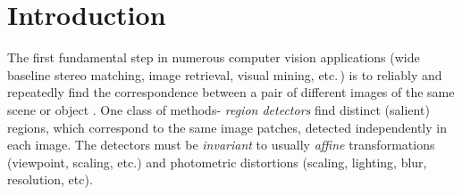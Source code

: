\documentclass[conference,compsoc]{IEEEtran}
\begin{document}




%
\IEEEpeerreviewmaketitle


\section{Introduction}
\label{sec:intro}
The first fundamental step in numerous computer vision applications (wide baseline stereo matching, image retrieval, visual mining, etc.\,) is to reliably and repeatedly find the correspondence between a pair of different images of the same scene or object \cite{Matas2002BMVC, Rodriguez2013, EscaleraCVPR07}. One class of methods- {\em region detectors} find distinct (salient) regions, which correspond to the same image patches, detected independently in each image. The detectors must be {\em invariant} to usually {\em affine} transformations (viewpoint, scaling, etc.) and photometric distortions (scaling, lighting, blur, resolution, etc). 


\end{document}

